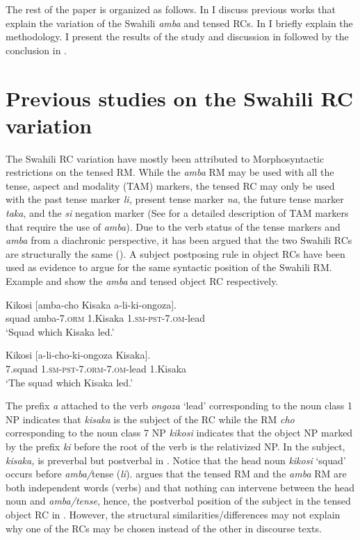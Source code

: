 \documentclass[output=paper,colorlinks,citecolor=brown]{langscibook}
\begin{document}
The rest of the paper is organized as follows. In  I discuss previous works that explain the variation of the Swahili \textit{amba} and tensed RCs. In  I briefly explain the methodology. I present the results of the study and discussion in  followed by the conclusion in .

\section{Previous studies on the Swahili RC variation}\label{sec:mwamzandi:2}

The Swahili RC variation have mostly been attributed to Morphosyntactic restrictions on the tensed RM. While the \textit{amba} RM may be used with all the tense, aspect and modality (TAM) markers, the tensed RC may only be used with the past tense marker \textit{li,} present tense marker \textit{na}, the future tense marker \textit{taka}, and the \textit{si} negation marker (See \citealt{Keach1985} for a detailed description of TAM markers that require the use of \textit{amba}). Due to the verb status of the tense markers and \textit{amba} from a diachronic perspective, it has been argued that the two Swahili RCs are structurally the same (\citealt{Vitale1981, Keach1985, DemuthHarford1999, Ngonyani2001, Ngonyani2006}). A subject postposing rule in object RCs have been used as evidence to argue for the same syntactic position of the Swahili RM. Example  and  show the \textit{amba} and tensed object RC respectively.

\ea%
    \label{ex:mwamzandi:6}
    \gll    Kikosi [amba-cho Kisaka a-li-ki-ongoza].\\
            squad  amba\textsc{-7.orm}  1.Kisaka  \textsc{1.sm-pst-7.om-}lead\\
    \glt    ‘Squad which Kisaka led.’
\z

\ea%
    \label{ex:mwamzandi:7}
    \gll    Kikosi  [a-li-cho-ki-ongoza Kisaka].\\
            7.squad  \textsc{1.sm-pst-7.orm-7.om-}lead  1.Kisaka\\
    \glt    ‘The squad which Kisaka led.’
\z

The prefix \textit{a} attached to the verb \textit{ongoza} ‘lead’ corresponding to the noun class 1 NP indicates that \textit{kisaka} is the subject of the RC while the RM \textit{cho} corresponding to the noun class 7 NP \textit{kikosi} indicates that the object NP marked by the prefix \textit{ki} before the root of the verb is the relativized NP. In  the subject, \textit{kisaka,} is preverbal but postverbal in . Notice that the head noun \textit{kikosi} ‘squad’ occurs before \textit{amba/}tense (\textit{li}). \citet{Keach1985} argues that the tensed RM and the \textit{amba} RM are both independent words (verbs) and that nothing can intervene between the head noun and \textit{amba/tense}, hence, the postverbal position of the subject in the tensed object RC in . However, the structural similarities/differences may not explain why one of the RCs may be chosen instead of the other in discourse texts. 
\end{document}
